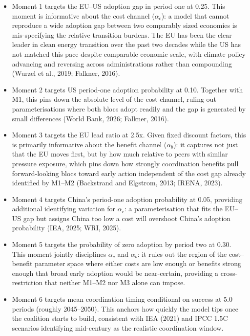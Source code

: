 \documentclass[10pt,a4paper]{article}
\begin{document}
\begin{itemize}[leftmargin=2em]
  \item Moment 1 targets the EU--US adoption gap in period one at 0.25. This moment is informative
  about the cost channel ($\alpha_c$): a model that cannot reproduce a wide adoption gap between two
  comparably sized economies is mis-specifying the relative transition burdens. The EU has been the
  clear leader in clean energy transition over the past two decades while the US has not matched this
  pace despite comparable economic scale, with climate policy advancing and reversing across
  administrations rather than compounding (Wurzel et al., 2019; Falkner, 2016).

  \item Moment 2 targets US period-one adoption probability at 0.10. Together with M1, this pins down the absolute level of the cost channel, ruling out parameterisations where both blocs adopt readily and the gap is generated by small differences (World Bank, 2026; Falkner, 2016).

  \item Moment 3 targets the EU lead ratio at 2.5x. Given fixed discount factors, this is primarily informative about the benefit channel ($\alpha_b$): it captures not just that the EU moves first, but by how much relative to peers with similar pressure exposure, which pins down how strongly coordination benefits pull forward-looking blocs toward early action independent of the cost gap already identified by M1--M2 (Backstrand and Elgstrom, 2013; IRENA, 2023).

  \item Moment 4 targets China's period-one adoption probability at 0.05, providing additional identifying variation for $\alpha_c$: a parameterisation that fits the EU--US gap but assigns China too low a cost will overshoot China's adoption probability (IEA, 2025; WRI, 2025).

  \item Moment 5 targets the probability of zero adoption by period two at 0.30. This moment jointly disciplines $\alpha_c$ and $\alpha_b$: it rules out the region of the cost--benefit parameter space where either costs are low enough or benefits strong enough that broad early adoption would be near-certain, providing a cross-restriction that neither M1--M2 nor M3 alone can impose.

  \item Moment 6 targets mean coordination timing conditional on success at 5.0 periods (roughly 2045--2050). This anchors how quickly the model tips once the coalition starts to build, consistent with IEA (2021) and IPCC 1.5\textdegree C scenarios identifying mid-century as the realistic coordination window.
\end{itemize}
\end{document}

